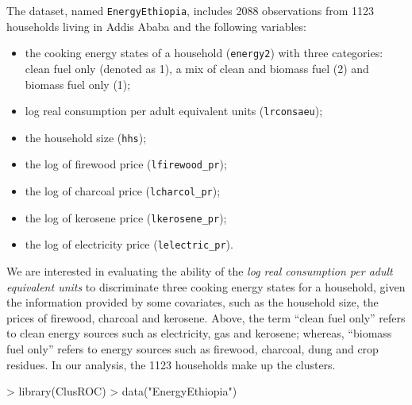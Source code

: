 The dataset, named \texttt{EnergyEthiopia}, includes 2088 observations from 1123 households living in Addis Ababa and the following variables:
\begin{itemize}
\item the cooking energy states of a household (\texttt{energy2}) with three categories: clean fuel only (denoted as 1), a mix of clean and biomass fuel (2) and biomass fuel only (1);
\item log real consumption per adult equivalent units (\texttt{lrconsaeu});
\item the household size (\texttt{hhs});
\item the log of firewood price (\texttt{lfirewood\_pr});
\item the log of charcoal price (\texttt{lcharcol\_pr});
\item the log of kerosene price (\texttt{lkerosene\_pr});
\item the log of electricity price (\texttt{lelectric\_pr}).
\end{itemize}

We are interested in evaluating the ability of the \emph{log real consumption per adult equivalent units} to discriminate three cooking energy states for a household, given the information provided by some covariates, such as the household size, the prices of firewood, charcoal and kerosene. Above, the term ``clean fuel only'' refers to clean energy sources such as electricity, gas and kerosene; whereas, ``biomass fuel only'' refers to energy sources such as firewood, charcoal, dung and crop residues. In our analysis, the 1123 households make up the clusters.


\begin{example}
> library(ClusROC)
> data("EnergyEthiopia")
\end{example}


